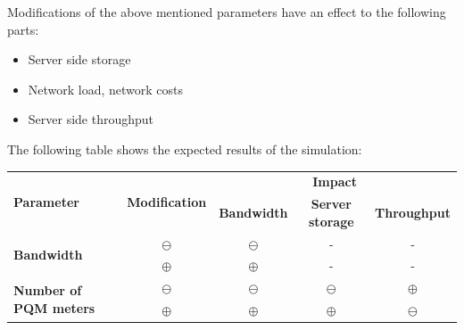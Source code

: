 Modifications of the above mentioned parameters have an effect to the following parts:

\begin{itemize}
	\item Server side storage
	\item Network load, network costs
	\item Server side throughput
\end{itemize}

The following table shows the expected results of the simulation:

\begin{table}[h]
\centering
\begin{tabular}{l|c|c|c|c}
\hline
\multicolumn{1}{l|}{\multirow{2}{*}{\textbf{Parameter}}} & \multicolumn{1}{c|}{\multirow{2}{*}{\textbf{Modification}}} & \multicolumn{3}{c}{\textbf{Impact}}                                                                                                  \\ \cline{3-5} 
\multicolumn{1}{c|}{}                                    & \multicolumn{1}{c|}{}                                       & \multicolumn{1}{c|}{\textbf{Bandwidth}} & \multicolumn{1}{c|}{\textbf{Server storage}} & \multicolumn{1}{c}{\textbf{Throughput}} \\ \hline \hline
\multirow{2}{*}{\textbf{Bandwidth}}                      & $\ominus$                                                           & $\ominus$                                       & -                                                 & -                                       \\ \cline{2-5} 
                                                         & $\oplus$                                                           & $\oplus$                                       & -                                                 & -                                       \\ \hline
\multirow{2}{*}{\textbf{Number of PQM meters}}           & $\ominus$                                                           & $\ominus$                                       & $\ominus$                                                 & $\oplus$                                       \\ \cline{2-5} 
                                                         & $\oplus$                                                           & $\oplus$                                       & $\oplus$                                                 & $\ominus$                                       \\ \hline

\end{tabular}
\end{table}
